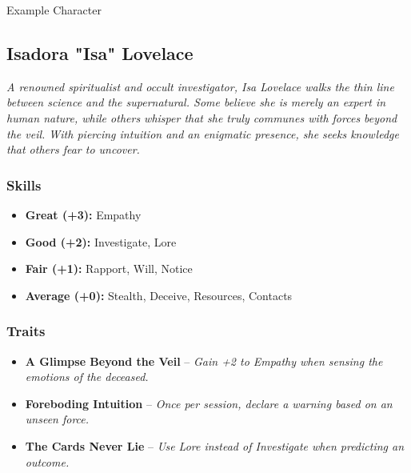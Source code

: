 \begin{DndSidebar}[float=!b]{Example Character}
\subsection{Isadora "Isa" Lovelace}
\emph{A renowned spiritualist and occult investigator, Isa Lovelace walks the thin line between science and the supernatural. Some believe she is merely an expert in human nature, while others whisper that she truly communes with forces beyond the veil. With piercing intuition and an enigmatic presence, she seeks knowledge that others fear to uncover.}

\subsubsection*{Skills}
\begin{itemize}
    \item \textbf{Great (+3):} Empathy
    \item \textbf{Good (+2):} Investigate, Lore
    \item \textbf{Fair (+1):} Rapport, Will, Notice
    \item \textbf{Average (+0):} Stealth, Deceive, Resources, Contacts
\end{itemize}

\subsubsection*{Traits}
\begin{itemize}
    \item \textbf{A Glimpse Beyond the Veil} – \emph{Gain +2 to Empathy when sensing the emotions of the deceased.}
    \item \textbf{Foreboding Intuition} – \emph{Once per session, declare a warning based on an unseen force.}
    \item \textbf{The Cards Never Lie} – \emph{Use Lore instead of Investigate when predicting an outcome.}
\end{itemize}
\end{DndSidebar}
